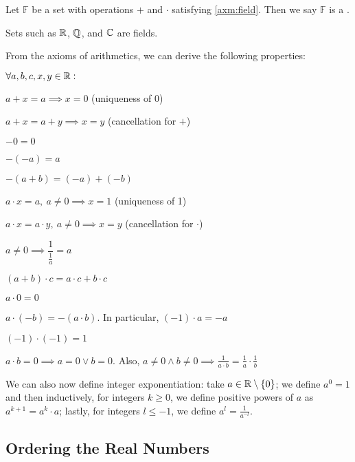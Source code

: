 \documentclass{styles/tufte}
\begin{document}
  \begin{definition}{}{}
    Let $\mathbb{F}$ be a set with operations $+$ and $\cdot$ satisfying \cref{axm:field}. Then we say $\mathbb{F}$ is a .
  \end{definition}
  Sets such as $\mathbb{R}$, $\mathbb{Q}$, and $\mathbb{C}$ are fields.
  
  From the axioms of arithmetics, we can derive the following properties:
  \begin{proposition}{}{}
    $\forall a, b, c, x, y \in \mathbb{R} :$
    \begin{romanenum}
      \item $a + x = a \implies x = 0$ \hfill (uniqueness of 0)
      \item $a + x = a + y \implies x = y$ \hfill (cancellation for $+$)
      \item $-0 = 0$
      \item $-(-a) = a$
      \item $-(a + b) = (-a) + (-b)$
      \item $a \cdot x = a,\ a \neq 0 \implies x = 1$ \hfill (uniqueness of 1)
      \item $a \cdot x = a \cdot y,\ a \neq 0 \implies x = y$ \hfill (cancellation for $\cdot$)
      \item $a \neq 0 \implies \dfrac{1}{\frac{1}{a}} = a$
      \item $(a + b) \cdot c = a \cdot c + b \cdot c$
      \item $a \cdot 0 = 0$
      \item $a \cdot (-b) = -(a \cdot b)$. In particular, $(-1) \cdot a = -a$
      \item $(-1) \cdot (-1) = 1$
      \item $a \cdot b = 0 \implies a = 0 \vee b = 0$. Also, $a \neq 0 \wedge b \neq 0 \implies \frac{1}{a \cdot b} = \frac{1}{a} \cdot \frac{1}{b}$
    \end{romanenum}
  \end{proposition}
  
  We can also now define integer exponentiation: take $a \in \mathbb{R} \setminus \set{0}$; we define $a^0 = 1$ and then inductively, for integers $k \geqslant 0$, we define positive powers of $a$ as $a^{k+1} = a^k \cdot a$; lastly, for integers $l \leqslant -1$, we define $a^l = \frac{1}{a^{-l}}$.
  
  
  \subsection{Ordering the Real Numbers}
    
\end{document}
